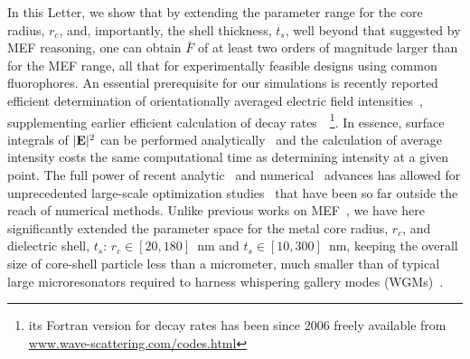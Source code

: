 \documentclass[9pt,twocolumn,twoside]{osajnl}
\newcommand{\vE}{{\bf E}}
\begin{document}
In this Letter, we show that by extending the parameter range for the core radius, $r_c$, and, importantly, the shell thickness, $t_s$, well beyond that suggested by MEF reasoning, one can obtain $\bar F$ of at least two orders of magnitude larger than for the MEF range, all that for experimentally feasible designs using common fluorophores.
An essential prerequisite for our simulations is recently reported efficient determination of orientationally averaged electric field intensities~\cite{Rasskazov19JOSAA,Rasskazov20OSAC}, supplementing earlier efficient calculation of decay rates~\cite{Moroz2005}~\footnote{its Fortran version for decay rates has been since 2006 freely available from 
\href{www.wave-scattering.com/codes.html}{www.wave-scattering.com/codes.html}}.
In essence, surface integrals of $|\vE|^2$ can be performed analytically~\cite{Rasskazov19JOSAA} and the calculation of average intensity costs the same computational time as determining intensity at a given point. The full power of recent analytic~\cite{Moroz2005,Rasskazov19JOSAA} and numerical~\cite{Rasskazov20OSAC} advances has allowed for unprecedented large-scale optimization studies~\cite{Sun20JPCC} that have been so far outside the reach of numerical methods. Unlike previous works on MEF~\cite{Sun20JPCC,Wan2021}, we have here significantly extended the parameter space for the metal core radius, $r_c$, and dielectric shell, $t_s$: $r_c \in [20,180]$~nm and $t_s \in [10,300]$~nm, keeping the overall size of core-shell particle less than a micrometer, much smaller than of typical large microresonators required to harness whispering gallery modes (WGMs)~\cite{Campillo1991,Barnes1996,Reynolds2017}.
\end{document}
